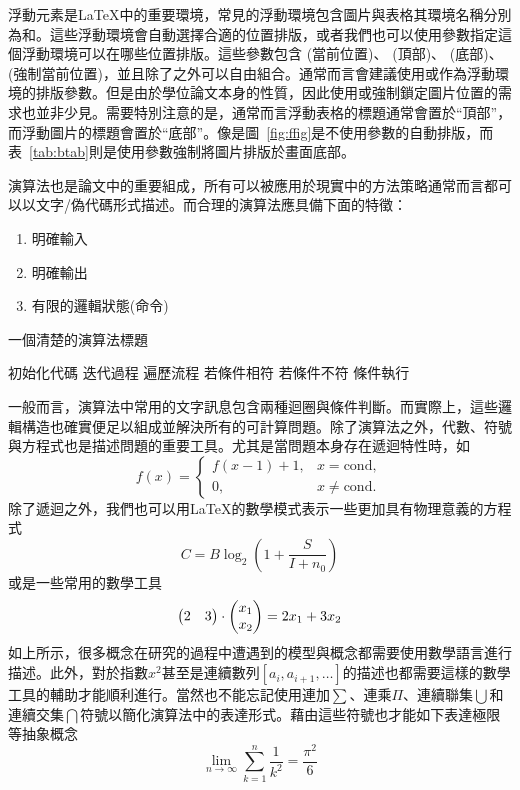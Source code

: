 \documentclass[12pt]{report}
\theoremstyle{plain}
\begin{document}
浮動元素是\LaTeX 中的重要環境，常見的浮動環境包含圖片與表格其環境名稱分別為和。這些浮動環境會自動選擇合適的位置排版，或者我們也可以使用參數指定這個浮動環境可以在哪些位置排版。這些參數包含 (當前位置)、 (頂部)、 (底部)、 (強制當前位置)，並且除了之外可以自由組合。通常而言會建議使用\code{[htb]}或\code{[tb]}作為浮動環境的排版參數。但是由於學位論文本身的性質，因此使用\code{[h]}或\code{[H]}強制鎖定圖片位置的需求也並非少見。需要特別注意的是，通常而言浮動表格的標題通常會置於``頂部''，而浮動圖片的標題會置於``底部''。像是圖~\ref{fig:ffig}是不使用參數的自動排版，而表~\ref{tab:btab}則是使用參數強制將圖片排版於畫面底部。

演算法也是論文中的重要組成，所有可以被應用於現實中的方法策略通常而言都可以以文字/偽代碼形式描述。而合理的演算法應具備下面的特徵：
\begin{enumerate}
    \item 明確輸入
    \item 明確輸出
    \item 有限的邏輯狀態(命令)
\end{enumerate}
\begin{algorithm}
\caption{一個清楚的演算法標題}
\label{alg:alg}
初始化代碼\;
{
    迭代過程\;
    {
        遍歷流程\;
        {
            若條件相符\;
        }
        {
            若條件不符\;
            {
                條件執行\;
            }
        }
    }
}
\end{algorithm}
一般而言，演算法中常用的文字訊息包含兩種迴圈與條件判斷。而實際上，這些邏輯構造也確實便足以組成並解決所有的可計算問題。除了演算法之外，代數、符號與方程式也是描述問題的重要工具。尤其是當問題本身存在遞迴特性時，如
\[
f(x) = 
\begin{cases}
    f(x-1)+1, &x=\mathrm{cond},\\
    0, &x\neq \mathrm{cond}.
\end{cases}
\]
除了遞迴之外，我們也可以用\LaTeX 的數學模式表示一些更加具有物理意義的方程式
\begin{equation}
\label{eq:eq}
    C=B\log_2\left(1+\frac{S}{I+n_0}\right)
\end{equation}
或是一些常用的數學工具
\begin{equation}
\begin{pmatrix} 
2 & 3 
\end{pmatrix} \cdot 
\begin{pmatrix} 
x_1 \\ 
x_2 
\end{pmatrix} 
= 2x_1 + 3x_2 \\
\end{equation}
如上所示，很多概念在研究的過程中遭遇到的模型與概念都需要使用數學語言進行描述。此外，對於指數$x^2$甚至是連續數列$[a_i,a_{i+1},\dots]$的描述也都需要這樣的數學工具的輔助才能順利進行。當然也不能忘記使用連加$\sum$、連乘$\Pi$、連續聯集$\bigcup$和連續交集$\bigcap$符號以簡化演算法中的表達形式。藉由這些符號也才能如下表達極限等抽象概念
\[
\lim_{n \to \infty} \sum_{k=1}^{n} \frac{1}{k^2} = \frac{\pi^2}{6}
\]
\end{document}
